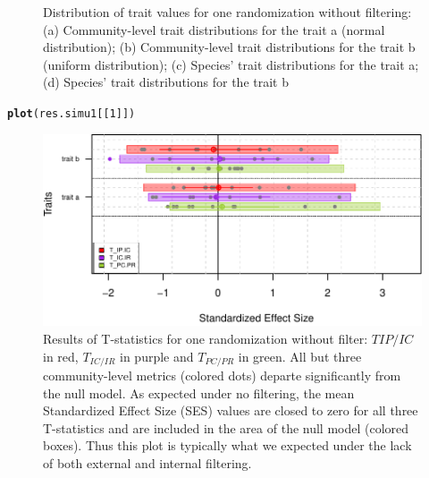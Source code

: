 \documentclass[12pt]{article}\usepackage[]{graphicx}\usepackage[]{color}
\makeatletter
\def\maxwidth{ %
  \ifdim\Gin@nat@width>\linewidth
    \linewidth
  \else
    \Gin@nat@width
  \fi
}
\newcommand{\hlnum}[1]{\textcolor[rgb]{0.686,0.059,0.569}{#1}}%
\newcommand{\hlstd}[1]{\textcolor[rgb]{0.345,0.345,0.345}{#1}}%
\newcommand{\hlkwd}[1]{\textcolor[rgb]{0.737,0.353,0.396}{\textbf{#1}}}%
\newenvironment{kframe}{%
 \def\at@end@of@kframe{}%
 \ifinner\ifhmode%
  \def\at@end@of@kframe{\end{minipage}}%
  \begin{minipage}{\columnwidth}%
 \fi\fi%
 \def\FrameCommand##1{\hskip\@totalleftmargin \hskip-\fboxsep
 \colorbox{shadecolor}{##1}\hskip-\fboxsep
     \hskip-\linewidth \hskip-\@totalleftmargin \hskip\columnwidth}%
 \MakeFramed {\advance\hsize-\width
   \@totalleftmargin\z@ \linewidth\hsize
   \@setminipage}}%
 {\par\unskip\endMakeFramed%
 \at@end@of@kframe}
\newenvironment{knitrout}{}{} %
\makeatother
\begin{document}
\begin{knitrout}
\begin{figure}
{}

\caption[Distribution of trait values for one randomization without filtering]{Distribution of trait values for one randomization without filtering: (a) Community-level trait distributions for the trait a (normal distribution); (b) Community-level trait distributions for the trait b (uniform distribution); (c) Species' trait distributions for the trait a; (d) Species' trait distributions for the trait b}\label{fig:No_Filter_plots}
\end{figure}


\end{knitrout}

\begin{knitrout}\small
{}\color{fgcolor}\begin{kframe}
\begin{alltt}
\hlkwd{plot}\hlstd{(res.simu1[[}\hlnum{1}\hlstd{]])}
\end{alltt}
\end{kframe}\begin{figure}

{\centering \includegraphics[width=\maxwidth]{figure/No_Filter_plots_Tstats-1} 

}

\caption[Results of T-statistics for one randomization without filter]{Results of T-statistics for one randomization without filter: $T IP/IC$ in red, $T_{IC/IR}$ in purple and $T_{PC/PR}$ in green. All but three community-level metrics (colored dots) departe significantly from the null model. As expected under no filtering, the mean Standardized Effect Size (SES) values are closed to zero for all three T-statistics and are included in the area of the null model (colored boxes). Thus this plot is typically what we expected under the lack of both external and internal filtering.}\label{fig:No_Filter_plots_Tstats}
\end{figure}


\end{knitrout}
\end{document}
